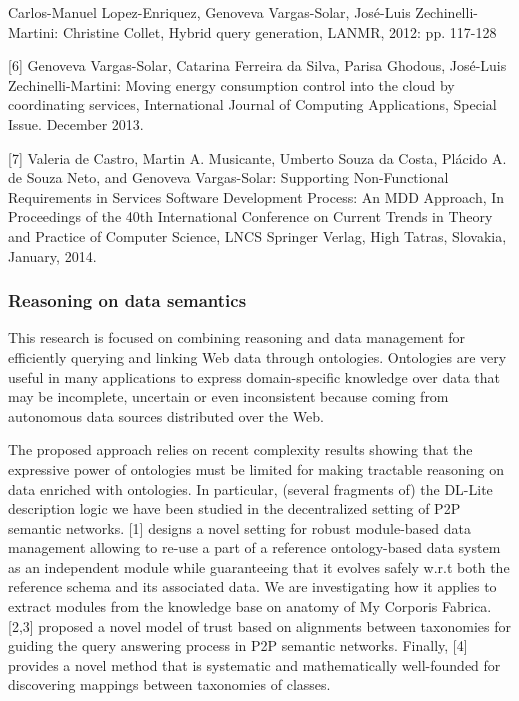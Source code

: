 \begin{description}
[5] Carlos-Manuel Lopez-Enriquez, Genoveva Vargas-Solar, Jos{\'e}-Luis Zechinelli-Martini: Christine Collet, Hybrid query generation,  LANMR, 2012: pp. 117-128

[6] Genoveva Vargas-Solar, Catarina Ferreira da Silva, Parisa Ghodous, Jos{\'e}-Luis Zechinelli-Martini: Moving energy consumption control into the cloud by coordinating services, International Journal of Computing Applications, Special Issue. December 2013.

[7] Valeria de Castro, Martin A. Musicante, Umberto Souza da Costa, Pl{\'a}cido A. de Souza Neto, and Genoveva Vargas-Solar: Supporting Non-Functional Requirements in Services Software Development Process: An MDD Approach, In Proceedings of the 40th International Conference on Current Trends in Theory and Practice of Computer Science,  LNCS Springer Verlag, High Tatras, Slovakia, January, 2014. 



\end{description}

\subsubsection{Reasoning on data semantics}

This research is focused on combining reasoning and data management for efficiently querying and linking Web data through ontologies. Ontologies are very useful in many applications to express domain-specific knowledge over data that may be incomplete, uncertain or even inconsistent because coming from autonomous data sources distributed over the Web. 

The proposed approach relies on recent complexity  results showing that the expressive power of ontologies must be limited for making tractable reasoning on data enriched with ontologies. In particular,  (several fragments of) the DL-Lite description logic  we have been studied  in the decentralized setting of P2P semantic networks. [1] designs a novel setting for robust module-based data management allowing to re-use a part of a  reference ontology-based data system as an independent module while guaranteeing that it evolves safely w.r.t both the reference  schema and its associated data. We are investigating how it applies to extract modules from the knowledge base on anatomy of My Corporis Fabrica.  [2,3]  proposed a novel model of trust based on alignments between taxonomies for guiding the query answering process in P2P semantic networks. Finally,  [4]  provides a novel method that is systematic and mathematically well-founded for discovering mappings between taxonomies of classes. 

